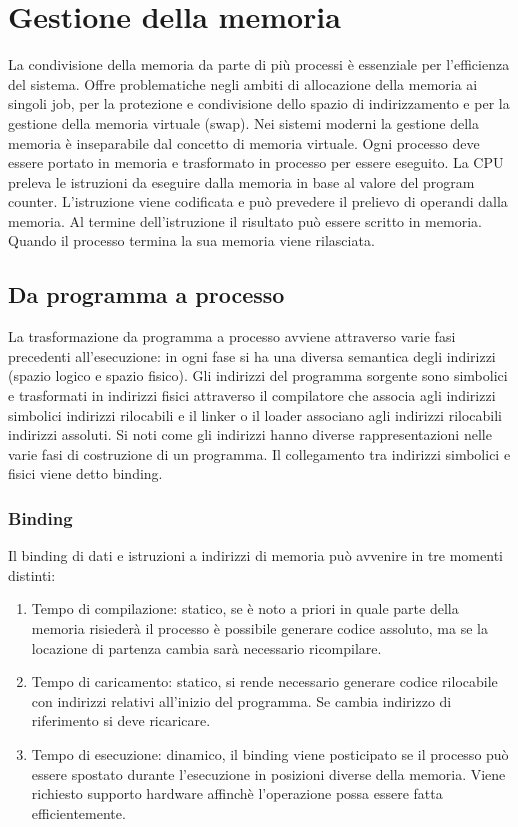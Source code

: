 \chapter{Gestione della memoria}
La condivisione della memoria da parte di pi\`u processi \`e essenziale per l'efficienza del sistema. Offre problematiche negli ambiti di allocazione della memoria ai singoli job, per
la protezione e condivisione dello spazio di indirizzamento e per la gestione della memoria virtuale (swap). Nei sistemi moderni la gestione della memoria \`e inseparabile dal concetto
di memoria virtuale. Ogni processo deve essere portato in memoria e trasformato in processo per essere eseguito. La CPU preleva le istruzioni da eseguire dalla memoria in base al
valore del program counter. L'istruzione viene codificata e pu\`o prevedere il prelievo di operandi dalla memoria. Al termine dell'istruzione il risultato pu\`o essere scritto in 
memoria. Quando il processo termina la sua memoria viene rilasciata. 
\section{Da programma a processo}
La trasformazione da programma a processo avviene attraverso varie fasi precedenti all'esecuzione: in ogni fase si ha una diversa semantica degli indirizzi (spazio logico e spazio
fisico). Gli indirizzi del programma sorgente sono simbolici e trasformati in indirizzi fisici attraverso il compilatore che associa agli indirizzi simbolici indirizzi rilocabili
e il linker o il loader associano agli indirizzi rilocabili indirizzi assoluti. Si noti come gli indirizzi hanno diverse rappresentazioni nelle varie fasi di costruzione di un programma.
Il collegamento tra indirizzi simbolici e fisici viene detto binding.
\subsection{Binding}
Il binding di dati e istruzioni a indirizzi di memoria pu\`o avvenire in tre momenti distinti:
\begin{enumerate}
	\item Tempo di compilazione: statico, se \`e noto a priori in quale parte della memoria risieder\`a il processo \`e possibile generare codice assoluto, ma se la locazione di 
		partenza cambia sar\`a necessario ricompilare.
	\item Tempo di caricamento: statico, si rende necessario generare codice rilocabile con indirizzi relativi all'inizio del programma. Se cambia indirizzo di riferimento si deve
		ricaricare. 
	\item Tempo di esecuzione: dinamico, il binding viene posticipato se il processo pu\`o essere spostato durante l'esecuzione in posizioni diverse della memoria. Viene richiesto 
		supporto hardware affinch\`e l'operazione possa essere fatta efficientemente. 
\end{enumerate}
